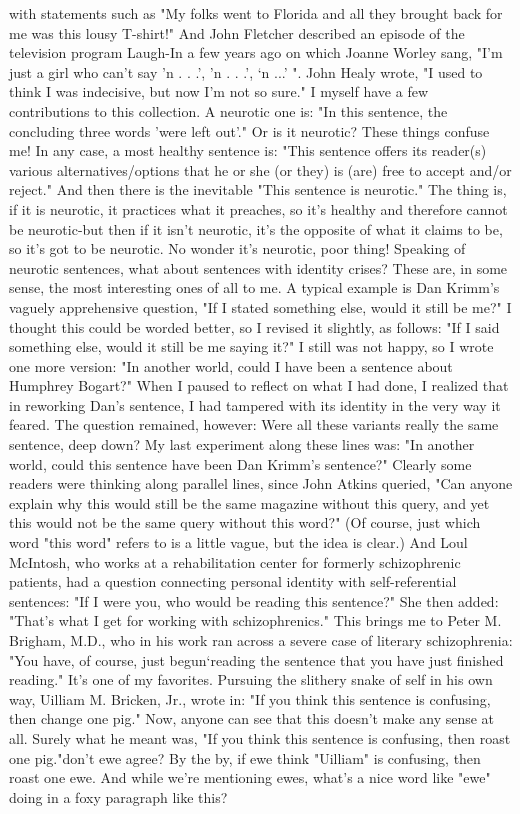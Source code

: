 with statements such as "My folks went to Florida and all they brought back for me was this lousy T-shirt!" And John Fletcher described an episode of the television program Laugh-In a few years ago on which Joanne Worley sang, "I'm just a girl who can't say 'n . . .', 'n . . .', `n ...' ". John Healy wrote, "I used to think I was indecisive, but now I'm not so sure." I myself have a few contributions to this collection. A neurotic one is: "In this sentence, the concluding three words 'were left out'." Or is it neurotic? These things confuse me! In any case, a most healthy sentence is: "This sentence offers its reader(s) various alternatives/options that he or she (or they) is (are) free to accept and/or reject." And then there is the inevitable "This sentence is neurotic." The thing is, if it is neurotic, it practices what it preaches, so it's healthy and therefore cannot be neurotic-but then if it isn't neurotic, it's the opposite of what it claims to be, so it's got to be neurotic. No wonder it's neurotic, poor thing! Speaking of neurotic sentences, what about sentences with identity crises? These are, in some sense, the most interesting ones of all to me. A typical example is Dan Krimm's vaguely apprehensive question, "If I stated something else, would it still be me?" I thought this could be worded better, so I revised it slightly, as follows: "If I said something else, would it still be me saying it?" I still was not happy, so I wrote one more version: "In another world, could I have been a sentence about Humphrey Bogart?" When I paused to reflect on what I had done, I realized that in reworking Dan's sentence, I had tampered with its identity in the very way it feared. The question remained, however: Were all these variants really the same sentence, deep down? My last experiment along these lines was: "In another world, could this sentence have been Dan Krimm's sentence?" Clearly some readers were thinking along parallel lines, since John Atkins queried, "Can anyone explain why this would still be the same magazine without this query, and yet this would not be the same query without this word?" (Of course, just which word "this word" refers to is a little vague, but the idea is clear.) And Loul McIntosh, who works at a rehabilitation center for formerly schizophrenic patients, had a question connecting personal identity with self-referential sentences: "If I were you, who would be reading this sentence?" She then added: "That's what I get for working with schizophrenics." This brings me to Peter M. Brigham, M.D., who in his work ran across a severe case of literary schizophrenia: "You have, of course, just begun`reading the sentence that you have just finished reading." It's one of my favorites. Pursuing the slithery snake of self in his own way, Uilliam M. Bricken, Jr., wrote in: "If you think this sentence is confusing, then change one pig." Now, anyone can see that this doesn't make any sense at all. Surely what he meant was, "If you think this sentence is confusing, then roast one pig."don't ewe agree? By the by, if ewe think "Uilliam" is confusing, then roast one ewe. And while we're mentioning ewes, what's a nice word like "ewe" doing in a foxy paragraph like this? 



